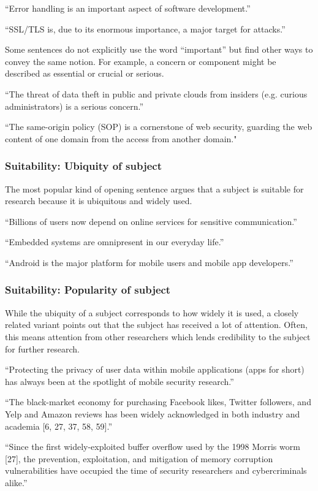 \documentclass[sigconf]{acmart}
\begin{document}
	``Error handling is an important aspect of software development.''
	
	``SSL/TLS is, due to its enormous importance, a major target for attacks.''
	
	Some sentences do not explicitly use the word “important” but find other ways to convey the same notion. For example, a concern or component might be described as essential or crucial or serious.
	
	``The threat of data theft in public and private clouds from insiders (e.g. curious administrators) is a serious concern.''
	
	``The same-origin policy (SOP) is a cornerstone of web security, guarding the web content of one domain from the access from another domain."
	
	\subsubsection{Suitability: Ubiquity of subject}
	
	The most popular kind of opening sentence argues that a subject is suitable for research because it is ubiquitous and widely used.
	
	``Billions of users now depend on online services for sensitive communication.''
	
	``Embedded systems are omnipresent in our everyday life.''
	
	``Android is the major platform for mobile users and mobile app developers.''
	
	\subsubsection{Suitability: Popularity of subject}
	
	While the ubiquity of a subject corresponds to how widely it is used, a closely related variant points out that the subject has received a lot of attention. Often, this means attention from other researchers which lends credibility to the subject for further research.
	
	``Protecting the privacy of user data within mobile applications (apps for short) has always been at the spotlight of mobile security research.''
	
	``The black-market economy for purchasing Facebook likes, Twitter followers, and Yelp and Amazon reviews has been widely acknowledged in both industry and academia [6, 27, 37, 58, 59].''
	
	``Since the first widely-exploited buffer overflow used by the 1998 Morris worm [27], the prevention, exploitation, and mitigation of memory corruption vulnerabilities have occupied the time of security researchers and cybercriminals alike.''
	
\end{document}
